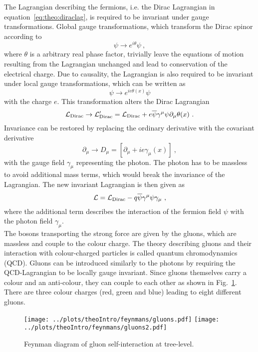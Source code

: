 \noindent The Lagrangian describing the fermions, i.e. the Dirac Lagrangian in equation~\ref{eq:theo:diraclag}, is required to be invariant under gauge transformations. Global gauge transformations, which transform the Dirac spinor according to
\begin{equation}
\psi\rightarrow e^{i\theta}\psi ~,
\end{equation}
where $\theta$ is a arbitrary real phase factor, trivially leave the equations of motion resulting from the Lagrangian unchanged and lead to conservation of the electrical charge. Due to causality, the Lagrangian is also required to be invariant under local gauge transformations, which can be written as
\begin{equation}
\psi\rightarrow e^{ie\theta(x)}\psi
\end{equation} 
with the charge $e$. This transformation alters the Dirac Lagrangian
\begin{equation}
\mathcal{L}_{\rm Dirac} \rightarrow \mathcal{L}_{\rm Dirac}' = \mathcal{L}_{\rm Dirac} + e\overline{\psi}\gamma^\mu\psi\partial_\mu \theta(x) ~.
\end{equation}
Invariance can be restored by replacing the ordinary derivative with the covariant derivative
\begin{equation}
\partial_\mu \rightarrow D_\mu = [\partial_\mu + ie\gamma_\mu(x)] ~,
\end{equation}
with the gauge field $\gamma_\mu$ representing the photon. The photon has to be massless to avoid additional mass terms, which would break the invariance of the Lagrangian. The new invariant Lagrangian is then given as
\begin{equation}
\mathcal{L} = \mathcal{L}_{\rm Dirac} - q\overline{\psi}\gamma^\mu\psi \gamma_\mu ~,
\end{equation}
where the additional term describes the interaction of the fermion field $\psi$ with the photon field $\gamma_\mu$.\\

\noindent The bosons transporting the strong force are given by the gluons, which are massless and couple to the colour charge. The theory describing gluons and their interaction with colour-charged particles is called quantum chromodynamics (QCD). Gluons can be introduced similarly to the photons by requiring the QCD-Lagrangian to be locally gauge invariant. Since gluons themselves carry a colour and an anti-colour, they can couple to each other as shown in Fig.~\ref{fig:theo:gluoncoupling}. There are three colour charges (red, green and blue) leading to eight different gluons.\\
\begin{figure}
	\centering
	\texttt{[image: ../plots/theoIntro/feynmans/gluons.pdf]}
	\texttt{[image: ../plots/theoIntro/feynmans/gluons2.pdf]}
	\caption[Feynman diagram of gluon self-interaction at tree-level]{Feynman diagram of gluon self-interaction at tree-level.}
	\label{fig:theo:gluoncoupling}
\end{figure}

